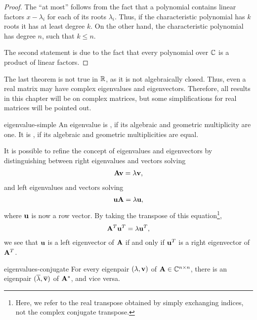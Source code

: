 \begin{proof}
  The ``at most'' follows from the fact that a polynomial contains
  linear factors $x-\lambda_i$ for each of its roots
  $\lambda_i$. Thus, if the characteristic polynomial has $k$ roots it
  has at least degree $k$. On the other hand, the characteristic
  polynomial has degree $n$, such that $k\le n$.

  The second statement is due to the fact that every polynomial over
  $\mathbb C$ is a product of linear factors.
\end{proof}

\begin{remark}
  The last theorem is not true in $\mathbb R$, as it is not algebraically
  closed. Thus, even a real matrix may have complex eigenvalues and
  eigenvectors. Therefore, all results in this chapter will be on
  complex matrices, but some simplifications for real matrices will be
  pointed out.
\end{remark}

\begin{Definition}{eigenvalue-simple}
  An eigenvalue is , if its algebraic and geometric multiplicity are one. It is , if its algebraic and geometric multiplicities are equal.
\end{Definition}

\begin{remark}
  It is possible to refine the concept of eigenvalues and eigenvectors by distinguishing between right eigenvalues and vectors solving
  \begin{gather}
      \mathbf A \mathbf v = \lambda \mathbf v,
  \end{gather}
  and left eigenvalues and vectors solving
  \begin{gather}
    \mathbf u \mathbf A = \lambda \mathbf u,
  \end{gather}
  where $\mathbf u$ is now a row vector. By taking the transpose of this equation\footnote{Here, we refer to the real transpose obtained by simply exchanging indices, not the complex conjugate transpose.},
  \begin{gather}
    \label{eq:evp:1}
    \mathbf A^T \mathbf u^T = \lambda \mathbf u^T,
  \end{gather}
  we see that $\mathbf u$ is a left eigenvector of $\mathbf A$ if and only if
  $\mathbf u^T$ is a right eigenvector of $\mathbf A^T$.
\end{remark}

\begin{Lemma}{eigenvalues-conjugate}
  For every eigenpair $(\lambda,\mathbf v)$ of $\mathbf A\in\mathbb C^{n\times n}$, there is an eigenpair $(\overline\lambda,\overline{\mathbf v})$ of $\mathbf A^*$, and vice versa.
\end{Lemma}

